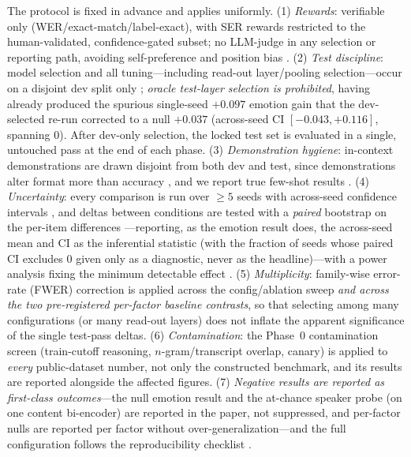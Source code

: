 The protocol is fixed in advance and applies uniformly. (1) \emph{Rewards}: verifiable only (WER/exact-match/label-exact), with SER rewards restricted to the human-validated, confidence-gated subset; no LLM-judge in any selection or reporting path, avoiding self-preference and position bias \citep{selfpreference2024,positionbias2024}. (2) \emph{Test discipline}: model selection and all tuning---including read-out layer/pooling selection---occur on a disjoint dev split only \citep{dwork2015reusable,roelofs2019overfitting}; \emph{oracle test-layer selection is prohibited}, having already produced the spurious single-seed $+0.097$ emotion gain that the dev-selected re-run corrected to a null $+0.037$ (across-seed CI $[-0.043,+0.116]$, spanning $0$). After dev-only selection, the locked test set is evaluated in a single, untouched pass at the end of each phase. (3) \emph{Demonstration hygiene}: in-context demonstrations are drawn disjoint from both dev and test, since demonstrations alter format more than accuracy \citep{min2022rethinking,alice2026}, and we report true few-shot results \citep{perez2021truefewshot}. (4) \emph{Uncertainty}: every comparison is run over $\geq 5$ seeds with across-seed confidence intervals \citep{henderson2018drlmatters}, and deltas between conditions are tested with a \emph{paired} bootstrap on the per-item differences \citep{bisani2004bootstrap,dror2018hitchhiker}---reporting, as the emotion result does, the across-seed mean and CI as the inferential statistic (with the fraction of seeds whose paired CI excludes $0$ given only as a diagnostic, never as the headline)---with a power analysis fixing the minimum detectable effect \citep{card2020power}. (5) \emph{Multiplicity}: family-wise error-rate (FWER) correction is applied across the config/ablation sweep \emph{and across the two pre-registered per-factor baseline contrasts}, so that selecting among many configurations (or many read-out layers) does not inflate the apparent significance of the single test-pass deltas. (6) \emph{Contamination}: the Phase~0 contamination screen (train-cutoff reasoning, $n$-gram/transcript overlap, canary) is applied to \emph{every} public-dataset number, not only the constructed benchmark, and its results are reported alongside the affected figures. (7) \emph{Negative results are reported as first-class outcomes}---the null emotion result and the at-chance speaker probe (on one content bi-encoder) are reported in the paper, not suppressed, and per-factor nulls are reported per factor without over-generalization---and the full configuration follows the reproducibility checklist \citep{pineau2020reproducibility,dodge2019showyourwork}.


